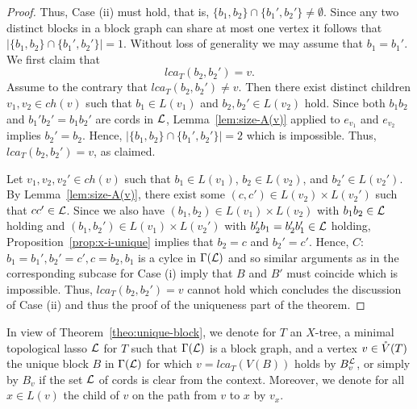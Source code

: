 \begin{proof}
Thus, Case (ii) must hold, that is,
$\{b_1,b_2\}\cap\{b_1',b_2'\}\not=\emptyset $. Since any two distinct blocks
in a block graph can share at most one vertex it follows that
$|\{b_1,b_2\}\cap\{b_1',b_2'\}|=1$.  Without loss of generality we may assume
that $b_1=b_1'$.  We first claim that
$$
lca_T(b_2,b_2')=v.
$$
Assume to the contrary that $lca_T(b_2,b_2')\not=v$.  Then there exist
distinct children $v_1,v_2 \in ch(v)$ such that $b_1\in L(v_1)$ and
$b_2,b_2'\in L(v_2)$ hold.  Since both $b_1b_2$ and $b_1'b_2'=b_1b_2'$ are
cords in ${\mathcal L}$, Lemma~\ref{lem:size-A(v)} applied to $e_{v_1}$ and $e_{v_2}$
implies $b_2'=b_2$. Hence, $|\{b_1,b_2\}\cap\{b_1',b_2'\}|=2$ which 
is impossible. Thus, $lca_T(b_2,b_2')=v$, as claimed.

Let $v_1,v_2,v_2'\in ch(v)$ such that $b_1\in L(v_1)$, $b_2\in L(v_2)$, and
$b_2'\in L(v_2')$.  By Lemma~\ref{lem:size-A(v)}, there exist some $(c,c')\in
L(v_2)\times L(v_2')$ such that $cc'\in {\mathcal L}$.  Since we also have
$(b_1,b_2)\in L(v_1)\times L(v_2)$ with $b_1b_2\in {\mathcal L}$ holding and
$(b_1,b_2')\in L(v_1)\times L(v_2')$ with $b_2'b_1=b_2'b_1'\in {\mathcal L}$ holding,
Proposition~\ref{prop:x-i-unique} implies that $b_2=c$ and $b_2'=c'$. Hence,
$C$: $b_1=b_1',b_2'=c', c=b_2,b_1$ is a cylce in $\Gamma({\mathcal L})$ and so similar
arguments as in the corresponding subcase for Case (i) imply that
%
%
$B$ and $B'$ must coincide which is impossible. Thus, $lca_T(b_2,b_2')=v$
cannot hold which concludes the discussion of Case (ii) and thus the proof of
the uniqueness part of the theorem.
\end{proof}

In view of Theorem~\ref{theo:unique-block}, we denote for $T$ an $X$-tree, a
minimal topological lasso ${\mathcal L}$ for $T$ such that $\Gamma({\mathcal L})$ is a block
graph, and a vertex $v\in \mathring{V}(T)$ the unique block $B$ in $\Gamma({\mathcal L})$ for
which $v=lca_T(V(B))$ holds by $B_v^{{\mathcal L}}$, or simply by $B_v$ if the set
${\mathcal L}$ of cords is clear from the context.  Moreover, we denote for all $x\in
L(v)$ the child of $v$ on the path from $v$ to $x$ by $v_x$.

